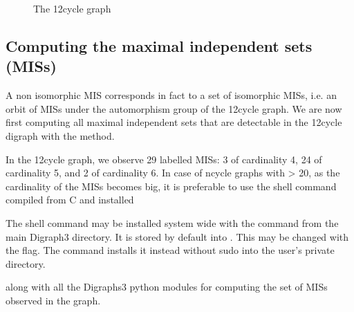 \documentclass[a4paper,12pt,english]{sphinxhowto}
\let\sphinxpxdimen\pdfpxdimen\else\newdimen\sphinxpxdimen
\begin{document}
\begin{figure}[H]
\centering
\capstart

\noindent\sphinxincludegraphics[width=400\sphinxpxdimen]{{cg12}.png}
\caption{The 12\sphinxhyphen{}cycle graph}\label{\detokenize{tutorial:id198}}\end{figure}


\subsection{Computing the maximal independent sets (MISs)}
\label{\detokenize{tutorial:computing-the-maximal-independent-sets-miss}}
A non isomorphic MIS corresponds in fact to a set of isomorphic MISs, i.e. an orbit of MISs under the automorphism group of the 12\sphinxhyphen{}cycle graph. We are now first computing all maximal independent sets that are detectable in the 12\sphinxhyphen{}cycle digraph with the  method.

\begin{sphinxVerbatim}[commandchars=\\\{\},numbers=left,firstnumber=1,stepnumber=1]
\end{sphinxVerbatim}

In the 12\sphinxhyphen{}cycle graph, we observe 29 labelled MISs: \textendash{} 3 of cardinality 4, 24 of cardinality 5, and 2  of cardinality 6. In case of n\sphinxhyphen{}cycle graphs with  \textgreater{} 20, as the cardinality of the MISs becomes big, it is preferable to use the shell  command compiled from C and installed %
\begin{footnote}[3]\sphinxAtStartFootnote
The  shell command may be installed system wide with the command  from the main Digraph3 directory. It is stored by default into . This may be changed with the  flag. The command  installs it instead without sudo into the user’s private  directory.
%
\end{footnote}  along with all the Digraphs3 python modules for computing the set of MISs observed in the graph.
\end{document}
